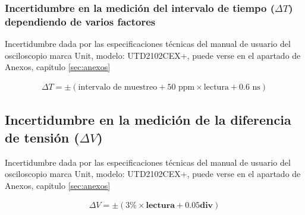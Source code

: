 \subsubsection{Incertidumbre en la medición del intervalo de tiempo ($\Delta T$) dependiendo de varios factores}

Incertidumbre dada por las especificaciones técnicas del manual de usuario del osciloscopio marca Unit, modelo: UTD2102CEX+, puede verse en el apartado de Anexos, capitulo \ref{sec:anexos}

\begin{gather}
    \Delta T = \pm \left( \text{intervalo de muestreo} + 50 \text{ ppm} \times \text{lectura} + 0.6 \text{ ns} \right)
    \label{eqn:delta_t}
\end{gather}

\subsection{Incertidumbre en la medición de la diferencia de tensión ($\Delta V$)}

Incertidumbre dada por las especificaciones técnicas del manual de usuario del osciloscopio marca Unit, modelo: UTD2102CEX+, puede verse en el apartado de Anexos, capitulo \ref{sec:anexos}

\begin{gather}
    \Delta V = \pm (3\% \times \textbf{lectura} + 0.05 \textbf{div} ) \label{eqn:delta_v}
\end{gather}






\newpage